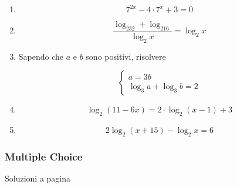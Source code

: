 \begin{enumerate}[label={Esercizio \arabic* },wide = 1cm, font =\bfseries]
\item \begin{equation*}
7^{2x}-4\cdot 7^x+3=0
\end{equation*}


\item\begin{equation*}
\frac{
\log_232+\log_216
}{
\log_2x
}=\log_2x
\end{equation*}

\item Sapendo che $a$ e $b$ sono positivi, risolvere

\begin{equation*}
\left\{
\begin{array}{ll}
a = 3b\\
\log_3 a + \log_3 b = 2
\end{array}
\right.
\end{equation*}


\item \begin{equation*}
\log_2(11-6x) = 2\cdot \log_2(x-1)+3
\end{equation*}

\item \begin{equation*}
2\log_2(x+15)-\log_2x=6
\end{equation*}



\end{enumerate}


\subsubsection{Multiple Choice}\label{subsec:mult_choice}

Soluzioni a pagina \pageref{sol_mc} \label{ex_mc}\label{ex_mc}

